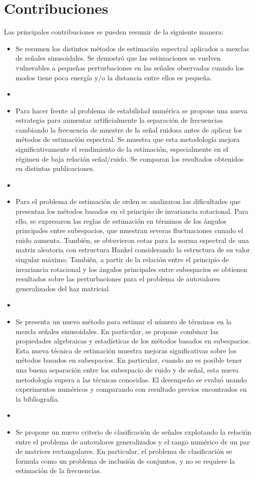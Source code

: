 \section{Contribuciones}

Las principales contribuciones se pueden resumir de la siguiente manera:
\begin{itemize}
	\item Se resumen los distintos métodos de estimación espectral aplicados a mezclas de señales sinusoidales. Se demostró que las estimaciones se vuelven vulnerables a pequeñas perturbaciones en las señales observadas cuando los modos tiene poca energía y/o la distancia entre ellos es pequeña.
	\item[] 
	\item Para hacer frente al problema de estabilidad numérica se propone una nueva estrategia para aumentar artificialmente la separación de frecuencias cambiando la frecuencia de muestre de la señal ruidosa antes de aplicar los métodos de estimación espectral. Se muestra que esta metodología mejora significativamente el rendimiento de la estimación, especialmente en el régimen de baja relación señal/ruido. Se comparan los resultados obtenidos en distintas publicaciones.
	\item[] 
    \item Para el problema de estimación de orden se analizaron las dificultades que presentan los métodos basados en el principio de invariancia rotacional. Para ello, se expresaron las reglas de estimación en términos de los ángulos principales entre subespacios, que muestran severas fluctuaciones cunado el ruido aumenta. También, se obtuvieron cotas para la norma espectral de una matriz aleatoria con estructura Hankel considerando la estructura de su valor singular máximo. También, a partir de la relación entre el principio de invariancia rotacional y los ángulos principales entre subespacios se obtienen resultados sobre las perturbaciones para el problema de autovalores generalizados del haz matricial. %
    \item[]
	\item Se presenta un nuevo método para estimar el número de términos en la mezcla señales sinusoidales. En particular, se propone combinar las propiedades algebraicas y estadísticas de los métodos basados en subespacios. Esta nueva técnica de estimación  muestra mejoras significativas sobre los métodos basados en subespacios. En particular, cuando no es posible tener una buena separación entre los subespacio de ruido y de señal, esta nueva metodología supera a las técnicas conocidas. El desempeño se evaluó usando experimentos numéricos y comparando con resultado previos encontrados en la bibliografía.
	\item[]
	\item Se propone un nuevo criterio de clasificación de señales explotando la relación entre el problema de autovalores generalizados y el rango numérico de un par de matrices rectangulares. En particular, el problema de clasificación se formula como un problema de inclusión de conjuntos, y no se requiere la estimación de la frecuencias.
\end{itemize}


